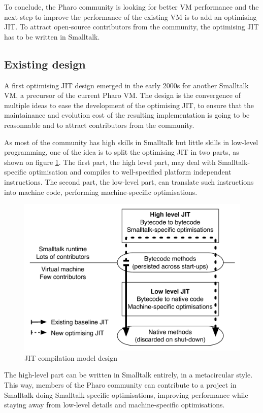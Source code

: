 \documentclass[a4paper,12pt,twoside]{../includes/ThesisStyle}
\begin{document}
To conclude, the Pharo community is looking for better VM performance and the next step to improve the performance of the existing VM is to add an optimising JIT. To attract open-source contributors from the community, the optimising JIT has to be written in Smalltalk.

\subsection{Existing design}

A first optimising JIT design emerged in the early 2000s for another Smalltalk VM, a precursor of the current Pharo VM. The design is the convergence of multiple ideas to ease the development of the optimising JIT, to ensure that the maintainance and evolution cost of the resulting implementation is going to be reasonnable and to attract contributors from the community.

As most of the community has high skills in Smalltalk but little skills in low-level programming, one of the idea is to split the optimising JIT in two parts, as shown on figure \ref{fig:ExistingDesign}. The first part, the high level part, may deal with Smalltalk-specific optimisation and compiles to well-specified platform independent instructions. The second part, the low-level part, can translate such instructions into machine code, performing machine-specific optimisations.

\begin{figure}[h!]
    \begin{center}
        \includegraphics[width=0.8\linewidth]{ExistingDesign}
        \caption{JIT compilation model design}
        \label{fig:ExistingDesign}
    \end{center}
\end{figure}

The high-level part can be written in Smalltalk entirely, in a metacircular style. This way, members of the Pharo community can contribute to a project in Smalltalk doing Smalltalk-specific optimisations, improving performance while staying away from low-level details and machine-specific optimisations. 
\end{document}
